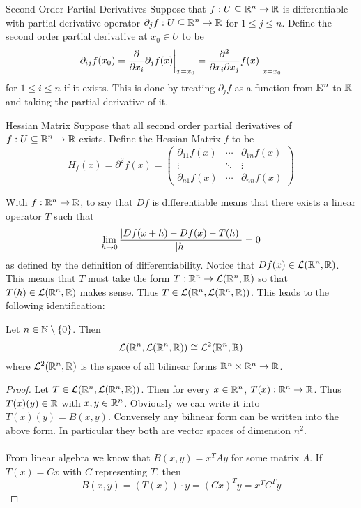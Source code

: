 \documentclass[a4paper]{article}
\begin{document}
\begin{defn}{Second Order Partial Derivatives}{} Suppose that $f:U\subseteq\mathbb{R}^n\to\mathbb{R}$ is differentiable with partial derivative operator $\partial_jf:U\subseteq\mathbb{R}^n\to\mathbb{R}$ for $1\leq j\leq n$. Define the second order partial derivative at $x_0\in U$ to be $$\partial_{ij}f(x_0)=\frac{\partial}{\partial x_i}\partial_jf(x)\bigg{|}_{x=x_0}=\frac{\partial^2}{\partial x_i\partial x_j}f(x)\bigg{|}_{x=x_0}$$
for $1\leq i\leq n$ if it exists. This is done by treating $\partial_jf$ as a function from $\mathbb{R}^n$ to $\mathbb{R}$ and taking the partial derivative of it. 
\end{defn}

\begin{defn}{Hessian Matrix}{} Suppose that all second order partial derivatives of $f:U\subseteq\mathbb{R}^n\to\mathbb{R}$ exists. Define the Hessian Matrix $f$ to be $$H_f(x)=\partial^2 f(x)=\begin{pmatrix}
\partial_{11}f(x) & \cdots & \partial_{1n}f(x)\\
\vdots & \ddots & \vdots\\
\partial_{n1}f(x) & \cdots & \partial_{nn}f(x)
\end{pmatrix}$$
\end{defn}

With $f:\mathbb{R}^n\to\mathbb{R}$, to say that $Df$ is differentiable means that there exists a linear operator $T$ such that $$\lim_{h\to 0}\frac{\abs{Df(x+h)-Df(x)-T(h)}}{\abs{h}}=0$$ as defined by the definition of differentiability. Notice that $Df(x)\in\mathcal{L}(\mathbb{R}^n,\mathbb{R})$. This means that $T$ must take the form $T:\mathbb{R}^n\to\mathcal{L}(\mathbb{R}^n,\mathbb{R})$ so that $T(h)\in\mathcal{L}(\mathbb{R}^n,\mathbb{R})$ makes sense. Thus $T\in\mathcal{L}(\mathbb{R}^n,\mathcal{L}(\mathbb{R}^n,\mathbb{R}))$. This leads to the following identification: 

\begin{prp}{}{} Let $n\in\mathbb{N}\setminus\{0\}$. Then $$\mathcal{L}(\mathbb{R}^n,\mathcal{L}(\mathbb{R}^n,\mathbb{R}))\cong\mathcal{L}^2(\mathbb{R}^n,\mathbb{R})$$ where $\mathcal{L}^2(\mathbb{R}^n,\mathbb{R})$ is the space of all bilinear forms $\mathbb{R}^n\times\mathbb{R}^n\to\mathbb{R}$. \tcbline
\begin{proof}
Let $T\in\mathcal{L}(\mathbb{R}^n,\mathcal{L}(\mathbb{R}^n,\mathbb{R}))$. Then for every $x\in\mathbb{R}^n$, $T(x):\mathbb{R}^n\to\mathbb{R}$. Thus $T(x)(y)\in\mathbb{R}$ with $x,y\in\mathbb{R}^n$. Obviously we can write it into $T(x)(y)=B(x,y)$. Conversely any bilinear form can be written into the above form. In particular they both are vector spaces of dimension $n^2$. \\~\\
From linear algebra we know that $B(x,y)=x^TAy$ for some matrix $A$. If $T(x)=Cx$ with $C$ representing $T$, then $$B(x,y)=(T(x))\cdot y=(Cx)^Ty=x^TC^Ty$$
\end{proof}
\end{prp}
\end{document}
